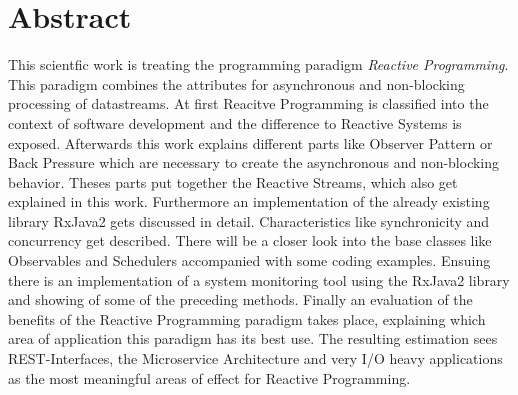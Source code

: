 \section*{Abstract} %
\label{cha:abtract}
This scientfic work is treating the programming paradigm \textit{Reactive Programming}. This paradigm combines the attributes for asynchronous and non-blocking processing of datastreams. At first Reacitve Programming is classified into the context of software development and the difference to Reactive Systems is exposed. Afterwards this work explains different parts like Observer Pattern or Back Pressure which are necessary to create the asynchronous and non-blocking behavior. Theses parts put together the Reactive Streams, which also get explained in this work. Furthermore an implementation of the already existing library RxJava2 gets discussed in detail. Characteristics like synchronicity and concurrency get described. There will be a closer look into the base classes like Observables and Schedulers accompanied with some coding examples. Ensuing there is an implementation of a system monitoring tool using the RxJava2 library and showing of some of the preceding methods. Finally an evaluation of the benefits of the Reactive Programming paradigm takes place, explaining which area of application this paradigm has its best use. The resulting estimation sees REST-Interfaces, the Microservice Architecture and very I/O heavy applications as the most meaningful areas of effect for Reactive Programming.
 

